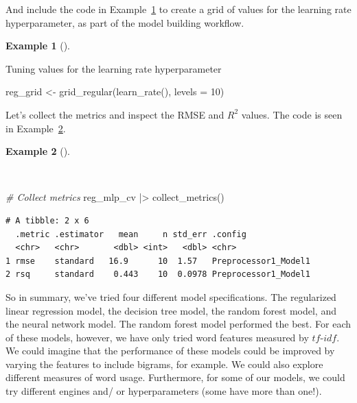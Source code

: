 \documentclass[
  letterpaper,
  krantz1]{latex/krantz-mod}
\newenvironment{Shaded}{\begin{snugshade}}{\end{snugshade}}
\newcommand{\AttributeTok}[1]{\textcolor[rgb]{0.00,0.00,0.00}{#1}}
\newcommand{\CommentTok}[1]{\textcolor[rgb]{0.00,0.00,0.00}{\textit{#1}}}
\newcommand{\DecValTok}[1]{\textcolor[rgb]{0.00,0.00,0.00}{#1}}
\newcommand{\FunctionTok}[1]{\textcolor[rgb]{0.00,0.00,0.00}{#1}}
\newcommand{\NormalTok}[1]{\textcolor[rgb]{0.00,0.00,0.00}{#1}}
\newcommand{\OtherTok}[1]{\textcolor[rgb]{0.00,0.00,0.00}{#1}}
\newcommand{\SpecialCharTok}[1]{\textcolor[rgb]{0.00,0.00,0.00}{#1}}
\theoremstyle{definition}
\newtheorem{example}{Example}[chapter]
\theoremstyle{definition}
\theoremstyle{remark}
\begin{document}
And include the code in Example~\ref{exm-predict-reg-mlp-learning-rate}
to create a grid of values for the learning rate hyperparameter, as part
of the model building workflow.

\begin{example}[]\protect\hypertarget{exm-predict-reg-mlp-learning-rate}{}\label{exm-predict-reg-mlp-learning-rate}

Tuning values for the learning rate hyperparameter

\begin{Shaded}
\begin{Highlighting}[numbers=left,,]
\NormalTok{reg\_grid }\OtherTok{\textless{}{-}}
  \FunctionTok{grid\_regular}\NormalTok{(}\FunctionTok{learn\_rate}\NormalTok{(), }\AttributeTok{levels =} \DecValTok{10}\NormalTok{)}
\end{Highlighting}
\end{Shaded}

\end{example}

Let's collect the metrics and inspect the RMSE and \(R^2\) values. The
code is seen in Example~\ref{exm-predict-reg-metrics-mlp}.

\begin{example}[]\protect\hypertarget{exm-predict-reg-metrics-mlp}{}\label{exm-predict-reg-metrics-mlp}

~

\begin{Shaded}
\begin{Highlighting}[numbers=left,,]
\CommentTok{\# Collect metrics}
\NormalTok{reg\_mlp\_cv }\SpecialCharTok{|\textgreater{}} \FunctionTok{collect\_metrics}\NormalTok{()}
\end{Highlighting}
\end{Shaded}

\begin{verbatim}
# A tibble: 2 x 6
  .metric .estimator   mean     n std_err .config             
  <chr>   <chr>       <dbl> <int>   <dbl> <chr>               
1 rmse    standard   16.9      10  1.57   Preprocessor1_Model1
2 rsq     standard    0.443    10  0.0978 Preprocessor1_Model1
\end{verbatim}

\end{example}

So in summary, we've tried four different model specifications. The
regularized linear regression model, the decision tree model, the random
forest model, and the neural network model. The random forest model
performed the best. For each of these models, however, we have only
tried word features measured by \(tf\)-\(idf\). We could imagine that
the performance of these models could be improved by varying the
features to include bigrams, for example. We could also explore
different measures of word usage. Furthermore, for some of our models,
we could try different engines and/ or hyperparameters (some have more
than one!).
\end{document}
